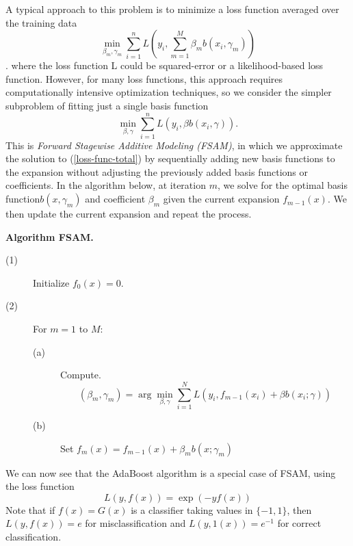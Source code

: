 \documentclass[11pt,twoside]{article}%
\theoremstyle{change}
\begin{document}
A typical approach to this problem is to minimize a loss function averaged
over the training data%
\begin{equation}
\min_{\beta_{m},\gamma_{m}}\sum_{i=1}^{n}L\left(  y_{i},\sum_{m=1}^{M}%
\beta_{m}b(x_{i},\gamma_{m})\right) \label{loss-func-total}%
\end{equation}
$.$ where the loss function L could be squared-error or a likelihood-based
loss function. However, for many loss functions, this approach requires
computationally intensive optimization techniques, so we consider the simpler
subproblem of fitting just a single basis function%
\[
\min_{\beta,\gamma}\sum_{i=1}^{n}L\left(  y_{i},\beta b(x_{i},\gamma)\right)
.
\]
This is \textit{Forward Stagewise Additive Modeling (FSAM)}, in which we
approximate the solution to (\ref{loss-func-total}) by sequentially adding new
basis functions to the expansion without adjusting the previously added basis
functions or coefficients. In the algorithm below, at iteration $m$, we solve
for the optimal basis function$b(x,\gamma_{m})$ and coefficient $\beta_{m}$
given the current expansion $f_{m-1}(x)$. We then update the current expansion
and repeat the process.

\bigskip

\textbf{Algorithm FSAM. }

\begin{description}
\item[(1)] Initialize $f_{0}(x)=0$.

\item[(2)] For $m=1$ to $M$:

\begin{description}
\item[(a)] Compute.%
\[
\left(  \beta_{m},\gamma_{m}\right)  =\arg\min_{\beta,\gamma}\sum_{i=1}%
^{N}L\left(  y_{i},f_{m-1}(x_{i})+\beta b(x_{i};\gamma)\right)
\]


\item[(b)] Set $f_{m}(x)=f_{m-1}(x)+\beta_{m}b(x;\gamma_{m})$
\end{description}
\end{description}

We can now see that the AdaBoost algorithm is a special case of FSAM, using
the loss function
\[
L(y,f(x))=\exp\left(  -yf(x)\right)
\]
Note that if $f(x)=G(x)$ is a classifier taking values in $\{-1,1\}$, then
$L(y,f(x))=e$ for misclassification and $L(y,1(x))=e^{-1}$ for correct classification.
\end{document}
